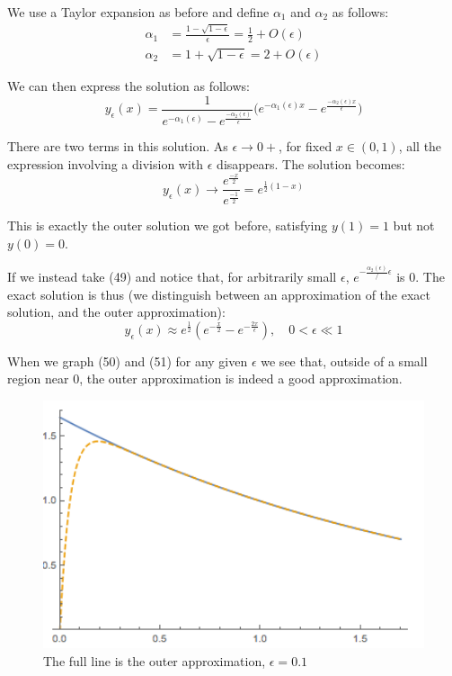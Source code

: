 \documentclass[12pt]{article}
\begin{document}
We use a Taylor expansion as before and define $\alpha_1$ and $\alpha_2$ as follows:
\begin{align}
  \alpha_1 &= \frac{1 - \sqrt{1-\epsilon}}{\epsilon} = \frac{1}{2} + O(\epsilon) \\
  \alpha_2 &= 1+ \sqrt{1-\epsilon} = 2 + O(\epsilon)
\end{align}

We can then express the solution as follows:
\begin{equation}
  y_{\epsilon}(x) = \frac{1}{e^{-\alpha_1(\epsilon)} - e^{\frac{-\alpha_2(\epsilon)}{\epsilon}}} \Big(e^{-\alpha_1(\epsilon)x} - e^{\frac{-\alpha_2(\epsilon)x}{\epsilon}}\Big)
\end{equation}

There are two terms in this solution. As $\epsilon \to 0+$, for fixed
$x \in (0,1)$, all the expression involving a division with $\epsilon$
disappears. The solution becomes:
\begin{equation}
  y_{\epsilon}(x) \to \frac{e^{\frac{-x}{2}}}{e^{\frac{-1}{2}}} = e^{\frac{1}{2}(1-x)}
\end{equation}

This is exactly the outer solution we got before, satisfying $y(1)=1$
but not $y(0)=0$.

If we instead take (49) and notice that, for arbitrarily small
$\epsilon$, $e^{-\frac{\alpha_2(\epsilon)}/{\epsilon}}$ is 0. The
exact solution is thus (we distinguish between an approximation of the
exact solution, and the outer approximation):
\begin{equation}
y_{\epsilon}(x) \approx e^{\frac{1}{2}}(e^{-\frac{x}{2}} -
  e^{-\frac{2x}{\epsilon}}), \quad 0 < \epsilon \ll 1
\end{equation}

When we graph (50) and (51) for any given $\epsilon$ we see that,
outside of a small region near 0, the outer approximation is indeed a
good approximation.
\begin{figure}[ht!]
\centering
\includegraphics[width=120mm]
{tmp_ode-outer.png}
\caption{The full line is the outer approximation, $\epsilon=0.1$}
\label{overflow}
\end{figure}
\end{document}
